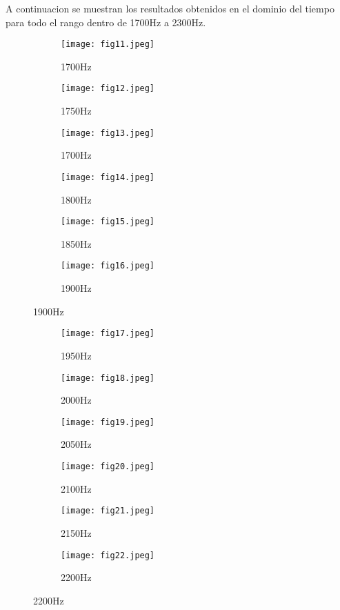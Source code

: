 \documentclass[12pt]{article}
\begin{document}
A continuacion se muestran los resultados obtenidos en el dominio del tiempo para todo el rango dentro de 1700Hz a 2300Hz.
\begin{figure}[h]
    \centering
    \begin{subfigure}{0.49\textwidth}
    \texttt{[image: fig11.jpeg]}
    \caption{1700Hz}
    \label{fig:11}
    \end{subfigure}
    \begin{subfigure}{0.49\textwidth}
        \texttt{[image: fig12.jpeg]}
        \caption{1750Hz}
        \label{fig:11}
    \end{subfigure}
    \begin{subfigure}{0.49\textwidth}
        \texttt{[image: fig13.jpeg]}
        \caption{1700Hz}
        \label{fig:11}
    \end{subfigure}
    \begin{subfigure}{0.49\textwidth}
        \texttt{[image: fig14.jpeg]}
        \caption{1800Hz}
        \label{fig:11}
    \end{subfigure}
    \begin{subfigure}{0.49\textwidth}
        \texttt{[image: fig15.jpeg]}
        \caption{1850Hz}
        \label{fig:11}
    \end{subfigure}
    \begin{subfigure}{0.49\textwidth}
        \texttt{[image: fig16.jpeg]}
        \caption{1900Hz}
        \label{fig:11}
    \end{subfigure}
\end{figure}

\begin{figure}[h]
    \centering
    \begin{subfigure}{0.49\textwidth}
        \texttt{[image: fig17.jpeg]}
        \caption{1950Hz}
        \label{fig:11}
    \end{subfigure}
    \begin{subfigure}{0.49\textwidth}
        \texttt{[image: fig18.jpeg]}
        \caption{2000Hz}
        \label{fig:11}
    \end{subfigure}
    \begin{subfigure}{0.49\textwidth}
    \texttt{[image: fig19.jpeg]}
    \caption{2050Hz}
    \label{fig:11}
    \end{subfigure}
    \begin{subfigure}{0.49\textwidth}
        \texttt{[image: fig20.jpeg]}
        \caption{2100Hz}
        \label{fig:11}
    \end{subfigure}
    \begin{subfigure}{0.49\textwidth}
        \texttt{[image: fig21.jpeg]}
        \caption{2150Hz}
        \label{fig:11}
    \end{subfigure}
    \begin{subfigure}{0.49\textwidth}
        \texttt{[image: fig22.jpeg]}
        \caption{2200Hz}
        \label{fig:11}
    \end{subfigure}
\end{figure}
\end{document}
